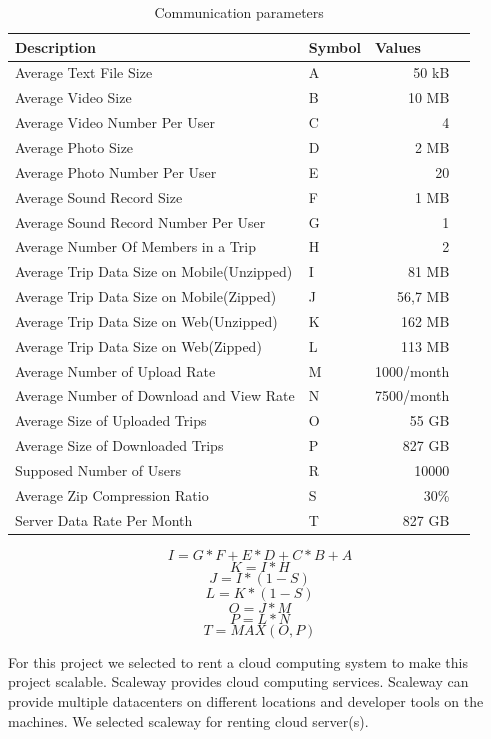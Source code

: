 \newpage
\begin{table}[!ht]
\centering
\caption{Communication parameters}
\label{table:commparameters}
\begin{tabular}{|l|l|r|r|}
\hline
\textbf{Description}                                                                   & \multicolumn{1}{l|}{\textbf{Symbol}} & \multicolumn{1}{l|}{\textbf{Values}} \\ \hline
Average Text File Size & A  & 50 kB \\ \hline
Average Video Size & B & 10 MB \\ \hline
Average Video Number Per User & C & 4 \\ \hline
Average Photo Size & D & 2 MB \\ \hline
Average Photo Number Per User & E & 20 \\ \hline
Average Sound Record Size & F & 1 MB \\ \hline
Average Sound Record Number Per User & G & 1 \\ \hline
Average Number Of Members in a Trip & H & 2 \\ \hline
Average Trip Data Size on Mobile(Unzipped) & I & 81 MB \\ \hline
Average Trip Data Size on Mobile(Zipped) & J & 56,7 MB \\ \hline
Average Trip Data Size on Web(Unzipped) & K & 162 MB \\ \hline
Average Trip Data Size on Web(Zipped) & L & 113 MB \\ \hline
Average Number of Upload Rate & M & 1000/month \\ \hline
Average Number of Download and View Rate & N & 7500/month \\ \hline
Average Size of Uploaded Trips & O & 55 GB \\ \hline
Average Size of Downloaded Trips  & P & 827 GB \\ \hline
Supposed Number of Users  & R & 10000 \\ \hline
Average Zip Compression Ratio \cite{zip} & S & 30\% \\ \hline
Server Data Rate Per Month & T & 827 GB \\ \hline
\end{tabular}
\end{table}


\[ I = G * F + E * D + C * B + A \]
\[ K = I * H \]
\[ J = I * (1 - S) \]
\[ L = K * (1 - S) \]
\[ O = J * M \]
\[ P = L * N \]
\[ T = MAX (O, P) \]

For this project we selected to rent a cloud computing system to make this project scalable. Scaleway \cite{scaleway} provides cloud computing services. Scaleway can provide multiple datacenters on different locations and developer tools on the machines. We selected scaleway for renting cloud server(s).


